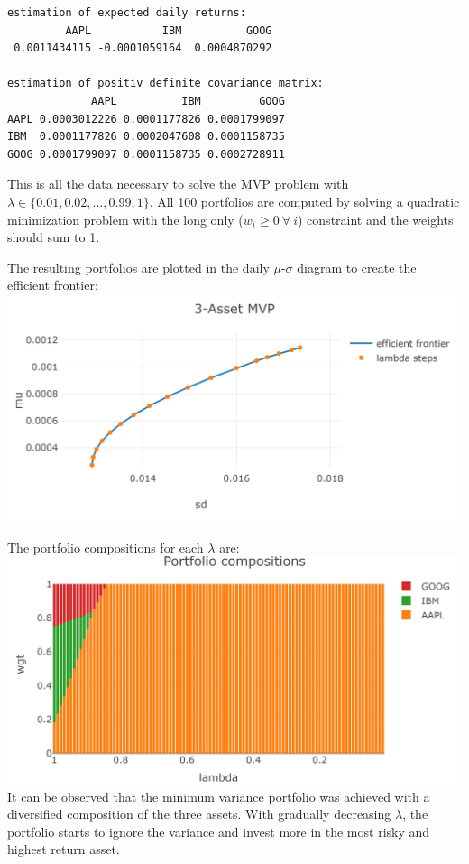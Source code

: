 \documentclass[
  oneside]{book}
\begin{document}
\begin{verbatim}
estimation of expected daily returns:
         AAPL           IBM          GOOG 
 0.0011434115 -0.0001059164  0.0004870292 

estimation of positiv definite covariance matrix:
             AAPL          IBM         GOOG
AAPL 0.0003012226 0.0001177826 0.0001799097
IBM  0.0001177826 0.0002047608 0.0001158735
GOOG 0.0001799097 0.0001158735 0.0002728911
\end{verbatim}

This is all the data necessary to solve the MVP problem with \(\lambda \in \{0.01, 0.02, ..., 0.99, 1\}\). All 100 portfolios are computed by solving a quadratic minimization problem with the long only (\(w_i \geq 0 \ \forall \ i\)) constraint and the weights should sum to 1.

The resulting portfolios are plotted in the daily \(\mu\)-\(\sigma\) diagram to create the efficient frontier:\\
\includegraphics{Master_Thesis_files/figure-latex/MVP_ex5-1.png}

The portfolio compositions for each \(\lambda\) are:\\
\includegraphics{Master_Thesis_files/figure-latex/MVP_ex6-1.png}
It can be observed that the minimum variance portfolio was achieved with a diversified composition of the three assets. With gradually decreasing \(\lambda\), the portfolio starts to ignore the variance and invest more in the most risky and highest return asset.
\end{document}
